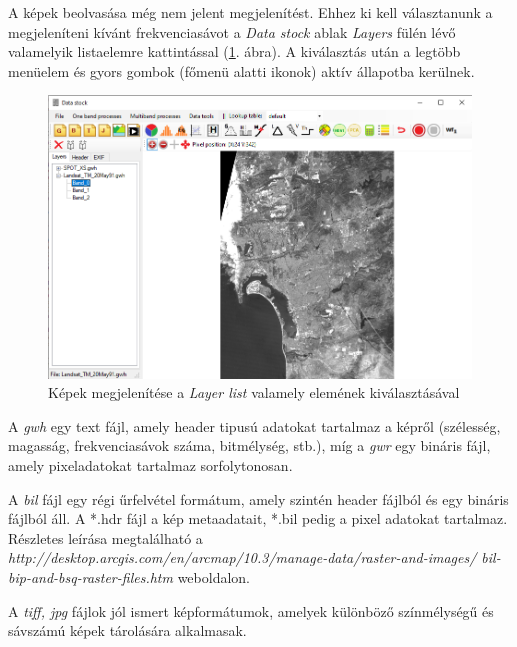 \documentclass[a4paper,12pt]{book}
\begin{document}
 A képek beolvasása még nem jelent megjelenítést. Ehhez ki kell választanunk a megjeleníteni kívánt frekvenciasávot a \textit{Data stock} ablak \textit{Layers} fülén lévő valamelyik listaelemre kattintással (\ref{fig:layer_list}. ábra). A kiválasztás után a legtöbb menüelem és gyors gombok (főmenü alatti ikonok) aktív állapotba kerülnek.
 
\begin{figure}
	\centering
	\includegraphics[width=14cm]{layer_list.png}
	\caption{Képek megjelenítése a \textit{Layer list} valamely elemének kiválasztásával}
	\label{fig:layer_list}
\end{figure} 
	
A \textit{gwh} egy text fájl, amely header tipusú adatokat tartalmaz a képről (szélesség, magasság, frekvenciasávok száma, bitmélység, stb.), míg a \textit{gwr} egy bináris fájl, amely pixeladatokat tartalmaz sorfolytonosan. 

A \textit{bil} fájl egy régi űrfelvétel formátum, amely szintén header fájlból és egy bináris fájlból áll. A *.hdr fájl a kép metaadatait, *.bil pedig a pixel adatokat tartalmaz. Részletes leírása megtalálható a \newline \textit{http://desktop.arcgis.com/en/arcmap/10.3/manage-data/raster-and-images/ bil-bip-and-bsq-raster-files.htm} weboldalon. 

A \textit{tiff, jpg} fájlok jól ismert képformátumok, amelyek különböző színmélységű és sávszámú képek tárolására alkalmasak.
\end{document}
